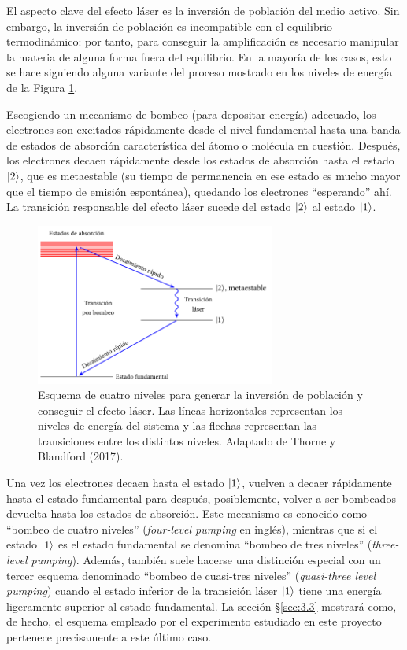 El aspecto clave del efecto láser es la inversión de población del medio activo. Sin embargo, la inversión de población es incompatible con el equilibrio termodinámico: por tanto, para conseguir la amplificación es necesario manipular la materia de alguna forma fuera del equilibrio. En la mayoría de los casos, esto se hace siguiendo alguna variante del proceso mostrado en los niveles de energía de la Figura \ref{fig:ch1_4_level}. 

Escogiendo un mecanismo de bombeo (para depositar energía) adecuado, los electrones son excitados rápidamente desde el nivel fundamental hasta una banda de estados de absorción característica del átomo o molécula en cuestión. Después, los electrones decaen rápidamente desde los estados de absorción hasta el estado $\left|2\right\rangle$, que es metaestable (su tiempo de permanencia en ese estado es mucho mayor que el tiempo de emisión espontánea), quedando los electrones \enquote{esperando} ahí. La transición responsable del efecto láser sucede del estado $\left|2\right\rangle$ al estado $\left|1\right\rangle$. 

\begin{figure}[htbp]
  \centering
  \includegraphics[width=0.7\textwidth]{Figuras/ch1_4_level_sch.pdf}
  \caption{Esquema de cuatro niveles para generar la inversión de población y conseguir el efecto láser. Las líneas horizontales representan los niveles de energía del sistema y las flechas representan las transiciones entre los distintos niveles. Adaptado de Thorne y Blandford (2017)\autocite{Thorne2017}.}
  \label{fig:ch1_4_level}
\end{figure}

Una vez los electrones decaen hasta el estado $\left|1\right\rangle$, vuelven a decaer rápidamente hasta el estado fundamental para después, posiblemente, volver a ser bombeados devuelta hasta los estados de absorción. Este mecanismo es conocido como \enquote{bombeo de cuatro niveles} (\emph{four-level pumping} en inglés), mientras que si el estado $\left|1\right\rangle$ es el estado fundamental se denomina \enquote{bombeo de tres niveles} (\emph{three-level pumping}). Además, también suele hacerse una distinción especial con un tercer esquema denominado \enquote{bombeo de cuasi-tres niveles} (\emph{quasi-three level pumping}) cuando el estado inferior de la transición láser $\left|1\right\rangle$ tiene una energía ligeramente superior al estado fundamental. La sección \S\ref{sec:3.3} mostrará como, de hecho, el esquema empleado por el experimento estudiado en este proyecto pertenece precisamente a este último caso.

